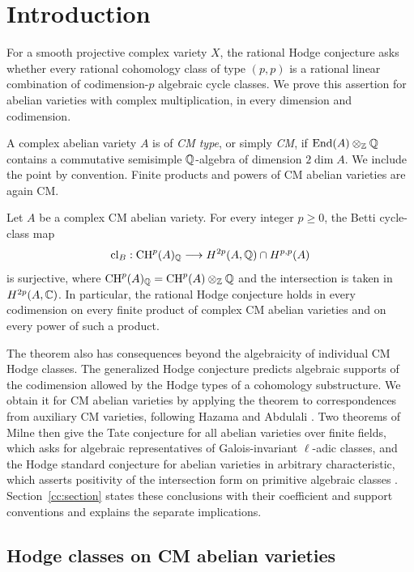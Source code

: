 \section{Introduction}\label{sec:introduction}

For a smooth projective complex variety \(X\), the rational Hodge
conjecture asks whether every rational cohomology class of type
\((p,p)\) is a rational linear combination of codimension-\(p\)
algebraic cycle classes.  We prove this assertion for abelian
varieties with complex multiplication, in every dimension and
codimension.

A complex abelian variety \(A\) is of \emph{CM type}, or simply
\emph{CM}, if \(\operatorname{End}(A)\otimes_{\mathbb{Z}}\mathbb{Q}\) contains a commutative
semisimple \(\mathbb{Q}\)-algebra of dimension \(2\dim A\).  We include the
point by convention.  Finite products and powers of CM abelian
varieties are again CM.

\begin{theorem}\label{thm:cm}
Let \(A\) be a complex CM abelian variety.  For every integer
\(p\geq0\), the Betti cycle-class map
\[
 \operatorname{cl}_B:\operatorname{CH}^p(A)_{\mathbb{Q}}
 \longrightarrow H^{2p}(A,\mathbb{Q})\cap H^{p,p}(A)
\]
is surjective, where \(\operatorname{CH}^p(A)_{\mathbb{Q}}=\operatorname{CH}^p(A)\otimes_{\mathbb{Z}}\mathbb{Q}\) and
the intersection is taken in \(H^{2p}(A,\mathbb{C})\).  In particular, the
rational Hodge conjecture holds in every codimension on every finite
product of complex CM abelian varieties and on every power of such a
product.
\end{theorem}

The theorem also has consequences beyond the algebraicity of individual
CM Hodge classes.  The generalized Hodge conjecture predicts algebraic
supports of the codimension allowed by the Hodge types of a cohomology
substructure.  We obtain it for CM abelian varieties by applying the
theorem to correspondences from auxiliary CM varieties, following
Hazama and Abdulali \cite{Hazama2003CM,Abdulali2005CM}.
Two theorems of Milne then give the Tate conjecture for all abelian
varieties over finite fields, which asks for algebraic representatives
of Galois-invariant \(\ell\)-adic classes, and the Hodge standard
conjecture for abelian varieties in arbitrary characteristic, which
asserts positivity of the intersection form on primitive algebraic
classes \cite{Milne1999Tate,Milne2002Polarizations}.
Section~\ref{cc:section} states these conclusions with their coefficient
and support conventions and explains the separate implications.

\subsection{Hodge classes on CM abelian varieties}

